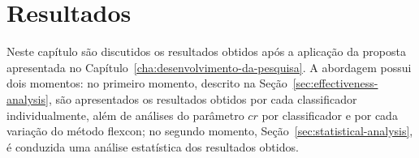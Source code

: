 


\chapter{Resultados}
    \label{cha:resultados}
    Neste capítulo são discutidos os resultados obtidos após a aplicação da proposta apresentada no Capítulo~\ref{cha:desenvolvimento-da-pesquisa}.
    A abordagem possui dois momentos: no primeiro momento, descrito na Seção~\ref{sec:effectiveness-analysis}, são apresentados os resultados obtidos por cada classificador individualmente, além de análises do parâmetro $cr$ por classificador e por cada variação do método \ac{flexcon}; no segundo momento, Seção~\ref{sec:statistical-analysis}, é conduzida uma análise estatística dos resultados obtidos.



